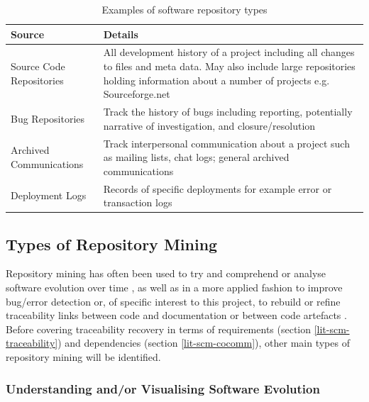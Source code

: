 \begin{table}[H]
\centering
\begin{tabular}{| l | p{8.5cm} |}
\hline
\textbf{Source} & \textbf{Details} \\ \hline

Source Code Repositories & All development history of a project including all changes to files and meta data. May also include large repositories holding information about a number of projects e.g. Sourceforge.net \\ \hline
Bug Repositories & Track the history of bugs including reporting, potentially narrative of investigation, and closure/resolution \\ \hline
Archived Communications & Track interpersonal communication about a project such as mailing lists, chat logs; general archived communications \\ \hline
Deployment Logs & Records of specific deployments for example error or transaction logs \\ \hline


\end{tabular}
\caption{Examples of software repository types \citep{hassan_road_2008,kagdi_survey_2007}}
\label{tab-lit-repoexample}
\end{table}

\subsection{Types of Repository Mining}

Repository mining has often been used to try and comprehend or analyse software evolution over time \citep{kagdi_survey_2007}, as well as in a more applied fashion to improve bug/error detection \citep{williams_automatic_2005} or, of specific interest to this project, to rebuild or refine traceability links between code and documentation  \citep{ali_trustrace:_2013,antoniol_recovering_2002,marcus_recovering_2003,kagdi_mining_2007} or between code artefacts \citep{kagdi_survey_2007}. Before covering traceability recovery in terms of requirements (section \ref{lit-scm-traceability}) and dependencies (section \ref{lit-scm-cocomm}), other main types of repository mining will be identified.

\subsubsection{Understanding and/or Visualising Software Evolution}

